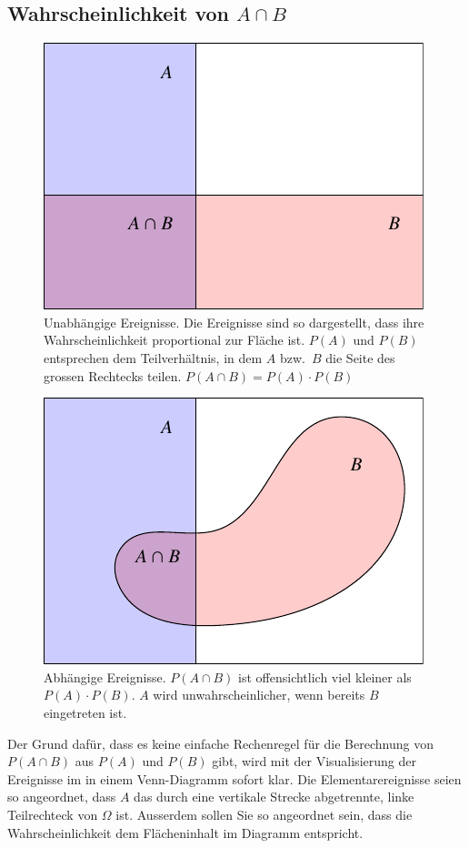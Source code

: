 \subsection{Wahrscheinlichkeit von \texorpdfstring{$A\cap B$}{A geschnitten B}}
\begin{figure}
\begin{center}
\includegraphics{images/abhaengigkeit-1}
\end{center}
\caption{Unabhängige Ereignisse.
Die Ereignisse sind so dargestellt,
dass ihre Wahrscheinlichkeit proportional zur Fläche ist.
$P(A)$ und $P(B)$
entsprechen dem Teilverhältnis, in dem $A$ bzw.~$B$ die Seite des grossen
Rechtecks teilen.
$P(A\cap B)=P(A)\cdot P(B)$\label{unabhaengig}}
\end{figure}
\begin{figure}
\begin{center}
\includegraphics{images/abhaengigkeit-2}
\end{center}
\caption{Abhängige Ereignisse.
$P(A\cap B)$ ist offensichtlich viel kleiner
als $P(A)\cdot P(B)$.
$A$ wird unwahrscheinlicher, wenn bereits $B$ eingetreten
ist.
\label{abhaengig}}
\end{figure}
Der Grund dafür, dass es keine einfache Rechenregel für die Berechnung von 
$P(A\cap B)$ aus $P(A)$ und $P(B)$ gibt, wird mit der
Visualisierung der Ereignisse im in einem Venn-Diagramm sofort klar.
Die Elementarereignisse seien so angeordnet, dass $A$ das durch eine
vertikale Strecke abgetrennte, linke Teilrechteck von $\Omega$ ist.
Ausserdem
sollen Sie so angeordnet sein, dass die Wahrscheinlichkeit dem
Flächeninhalt im Diagramm entspricht.

